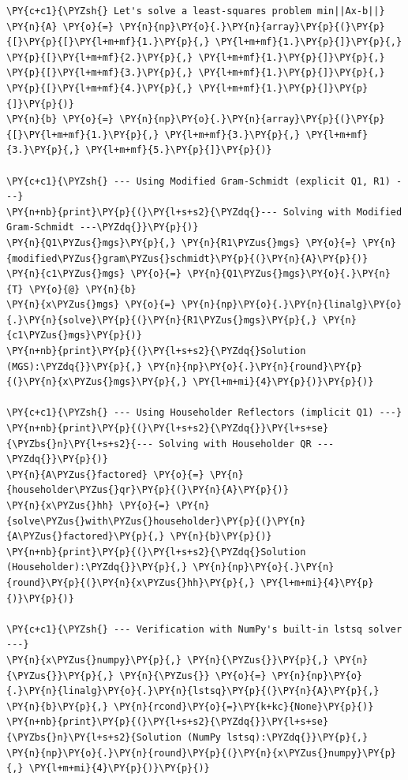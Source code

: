 \begin{verbatim}
\PY{c+c1}{\PYZsh{} Let's solve a least-squares problem min||Ax-b||}
\PY{n}{A} \PY{o}{=} \PY{n}{np}\PY{o}{.}\PY{n}{array}\PY{p}{(}\PY{p}{[}\PY{p}{[}\PY{l+m+mf}{1.}\PY{p}{,} \PY{l+m+mf}{1.}\PY{p}{]}\PY{p}{,} \PY{p}{[}\PY{l+m+mf}{2.}\PY{p}{,} \PY{l+m+mf}{1.}\PY{p}{]}\PY{p}{,} \PY{p}{[}\PY{l+m+mf}{3.}\PY{p}{,} \PY{l+m+mf}{1.}\PY{p}{]}\PY{p}{,} \PY{p}{[}\PY{l+m+mf}{4.}\PY{p}{,} \PY{l+m+mf}{1.}\PY{p}{]}\PY{p}{]}\PY{p}{)}
\PY{n}{b} \PY{o}{=} \PY{n}{np}\PY{o}{.}\PY{n}{array}\PY{p}{(}\PY{p}{[}\PY{l+m+mf}{1.}\PY{p}{,} \PY{l+m+mf}{3.}\PY{p}{,} \PY{l+m+mf}{3.}\PY{p}{,} \PY{l+m+mf}{5.}\PY{p}{]}\PY{p}{)}

\PY{c+c1}{\PYZsh{} --- Using Modified Gram-Schmidt (explicit Q1, R1) ---}
\PY{n+nb}{print}\PY{p}{(}\PY{l+s+s2}{\PYZdq{}--- Solving with Modified Gram-Schmidt ---\PYZdq{}}\PY{p}{)}
\PY{n}{Q1\PYZus{}mgs}\PY{p}{,} \PY{n}{R1\PYZus{}mgs} \PY{o}{=} \PY{n}{modified\PYZus{}gram\PYZus{}schmidt}\PY{p}{(}\PY{n}{A}\PY{p}{)}
\PY{n}{c1\PYZus{}mgs} \PY{o}{=} \PY{n}{Q1\PYZus{}mgs}\PY{o}{.}\PY{n}{T} \PY{o}{@} \PY{n}{b}
\PY{n}{x\PYZus{}mgs} \PY{o}{=} \PY{n}{np}\PY{o}{.}\PY{n}{linalg}\PY{o}{.}\PY{n}{solve}\PY{p}{(}\PY{n}{R1\PYZus{}mgs}\PY{p}{,} \PY{n}{c1\PYZus{}mgs}\PY{p}{)}
\PY{n+nb}{print}\PY{p}{(}\PY{l+s+s2}{\PYZdq{}Solution (MGS):\PYZdq{}}\PY{p}{,} \PY{n}{np}\PY{o}{.}\PY{n}{round}\PY{p}{(}\PY{n}{x\PYZus{}mgs}\PY{p}{,} \PY{l+m+mi}{4}\PY{p}{)}\PY{p}{)}

\PY{c+c1}{\PYZsh{} --- Using Householder Reflectors (implicit Q1) ---}
\PY{n+nb}{print}\PY{p}{(}\PY{l+s+s2}{\PYZdq{}}\PY{l+s+se}{\PYZbs{}n}\PY{l+s+s2}{--- Solving with Householder QR ---\PYZdq{}}\PY{p}{)}
\PY{n}{A\PYZus{}factored} \PY{o}{=} \PY{n}{householder\PYZus{}qr}\PY{p}{(}\PY{n}{A}\PY{p}{)}
\PY{n}{x\PYZus{}hh} \PY{o}{=} \PY{n}{solve\PYZus{}with\PYZus{}householder}\PY{p}{(}\PY{n}{A\PYZus{}factored}\PY{p}{,} \PY{n}{b}\PY{p}{)}
\PY{n+nb}{print}\PY{p}{(}\PY{l+s+s2}{\PYZdq{}Solution (Householder):\PYZdq{}}\PY{p}{,} \PY{n}{np}\PY{o}{.}\PY{n}{round}\PY{p}{(}\PY{n}{x\PYZus{}hh}\PY{p}{,} \PY{l+m+mi}{4}\PY{p}{)}\PY{p}{)}

\PY{c+c1}{\PYZsh{} --- Verification with NumPy's built-in lstsq solver ---}
\PY{n}{x\PYZus{}numpy}\PY{p}{,} \PY{n}{\PYZus{}}\PY{p}{,} \PY{n}{\PYZus{}}\PY{p}{,} \PY{n}{\PYZus{}} \PY{o}{=} \PY{n}{np}\PY{o}{.}\PY{n}{linalg}\PY{o}{.}\PY{n}{lstsq}\PY{p}{(}\PY{n}{A}\PY{p}{,} \PY{n}{b}\PY{p}{,} \PY{n}{rcond}\PY{o}{=}\PY{k+kc}{None}\PY{p}{)}
\PY{n+nb}{print}\PY{p}{(}\PY{l+s+s2}{\PYZdq{}}\PY{l+s+se}{\PYZbs{}n}\PY{l+s+s2}{Solution (NumPy lstsq):\PYZdq{}}\PY{p}{,} \PY{n}{np}\PY{o}{.}\PY{n}{round}\PY{p}{(}\PY{n}{x\PYZus{}numpy}\PY{p}{,} \PY{l+m+mi}{4}\PY{p}{)}\PY{p}{)}
\end{verbatim}